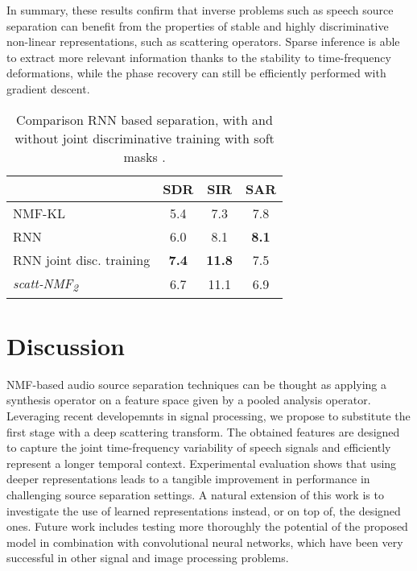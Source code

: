 In summary, these results confirm that inverse problems such as speech source separation 
can benefit from the properties of stable and highly discriminative non-linear representations, 
such as scattering operators. Sparse inference is able to extract more relevant information thanks 
to the stability to time-frequency deformations, while the phase recovery can still be efficiently performed
with gradient descent.



\begin{table}[tb]
\caption{Comparison RNN based separation, with and without joint discriminative training
with soft masks \cite{Huang_DNN_Separation_ICASSP2014}. \label{ta:eval2}}
\vspace{-5.5ex}
\begin{center}
\footnotesize{
\begin{tabular}{l|c|c|c}
  \hline\hline
& SDR & SIR & SAR \\
\hline
NMF-KL     & 5.4 &   7.3 &  7.8\\
\hline
RNN \cite{Huang_DNN_Separation_ICASSP2014} & 6.0  &   8.1 & {\bf 8.1}  \\
RNN joint disc. training \cite{Huang_DNN_Separation_ICASSP2014} & {\bf 7.4}  &   {\bf 11.8} & 7.5  \\
\hline
\emph{scatt-NMF\textsubscript{2}} &  6.7 & 11.1  & 6.9 \\
  \hline\hline
\end{tabular}
}
\end{center}
\vspace{-4.5ex}
\end{table}


\section{Discussion}
NMF-based audio source separation techniques can be thought as applying a synthesis operator on a feature space
given by a pooled analysis operator. Leveraging recent developemnts in signal processing, we propose to substitute
the first stage with a deep scattering transform. 
The obtained features are designed to capture the joint time-frequency variability of speech signals
and efficiently represent a longer temporal context. Experimental evaluation shows that using deeper representations
leads to a tangible improvement in performance in challenging source separation settings.
A natural extension of this work is to investigate the use of learned representations instead, or on top of,
the designed ones.
%
Future work includes testing more thoroughly the potential of the proposed model in combination
with convolutional neural networks, which have been very successful in other signal and image processing problems.

